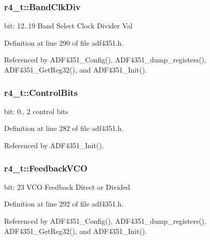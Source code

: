 \subsubsection[{\texorpdfstring{Band\+Clk\+Div}{BandClkDiv}}]{ r4\+\_\+t\+::\+Band\+Clk\+Div}\hypertarget{structr4__t_af9bbf20145437bb5913e815a71cc3eb5}{}\label{structr4__t_af9bbf20145437bb5913e815a71cc3eb5}
bit\+: 12..19 Band Select Clock Divider Val 

Definition at line 290 of file adf4351.\+h.



Referenced by A\+D\+F4351\+\_\+\+Config(), A\+D\+F4351\+\_\+dump\+\_\+registers(), A\+D\+F4351\+\_\+\+Get\+Reg32(), and A\+D\+F4351\+\_\+\+Init().

\subsubsection[{\texorpdfstring{Control\+Bits}{ControlBits}}]{ r4\+\_\+t\+::\+Control\+Bits}\hypertarget{structr4__t_a9f03fbb2e74ac5c97c73cd70755d95eb}{}\label{structr4__t_a9f03fbb2e74ac5c97c73cd70755d95eb}
bit\+: 0.. 2 control bits 

Definition at line 282 of file adf4351.\+h.



Referenced by A\+D\+F4351\+\_\+\+Init().

\subsubsection[{\texorpdfstring{Feedback\+V\+CO}{FeedbackVCO}}]{ r4\+\_\+t\+::\+Feedback\+V\+CO}\hypertarget{structr4__t_af070024e13538726836fc1c405aa0124}{}\label{structr4__t_af070024e13538726836fc1c405aa0124}
bit\+: 23 V\+CO Feedback Direct or Divided 

Definition at line 292 of file adf4351.\+h.



Referenced by A\+D\+F4351\+\_\+\+Config(), A\+D\+F4351\+\_\+dump\+\_\+registers(), A\+D\+F4351\+\_\+\+Get\+Reg32(), and A\+D\+F4351\+\_\+\+Init().

